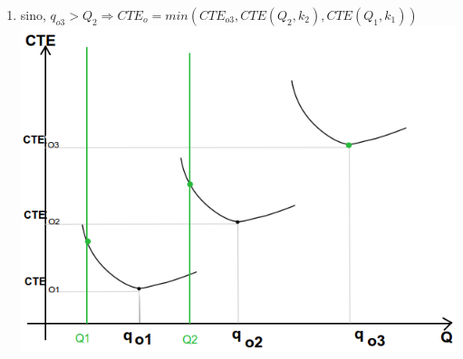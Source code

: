 \documentclass[a4paper,10pt]{article}
\begin{document}
\begin{enumerate}
 \item sino, $q_{o3} > Q_2 \Rightarrow CTE_o = min( CTE_{o3}, CTE(Q_2, k_2), CTE(Q_1, k_1) )$ \\
      \includegraphics[scale=0.4,keepaspectratio=true]{img/8/8_QvsCTE_3.png} 
\end{enumerate}
\end{document}
